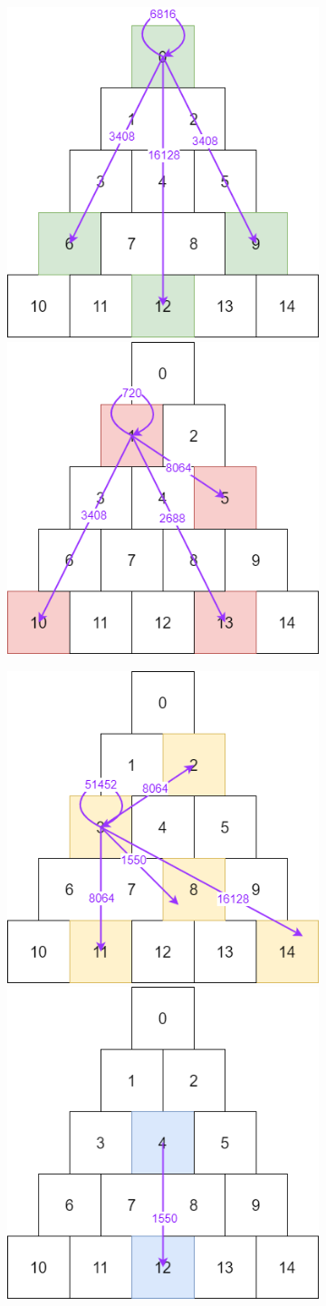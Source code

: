 \documentclass{article}
\begin{document}
\begin{center}
\begin{figure}[h]
    \begin{subfigure}[b]{1.7\linewidth}
        \includegraphics[width=0.25 \linewidth]{"./Images/0Class.png"}
        \hspace{1.5cm}
        \includegraphics[width=0.25 \linewidth]{"./Images/1Class.png"}
    \end{subfigure}
    \par\bigskip
    \par\bigskip
    \begin{subfigure}[b]{1.7\linewidth}
        \includegraphics[width=0.25 \linewidth]{"./Images/3Class.png"}
        \hspace{1.5cm}
        \includegraphics[width=0.25 \linewidth]{"./Images/4Class.png"}
    \end{subfigure}
\end{figure}
\end{center}
\end{document}
